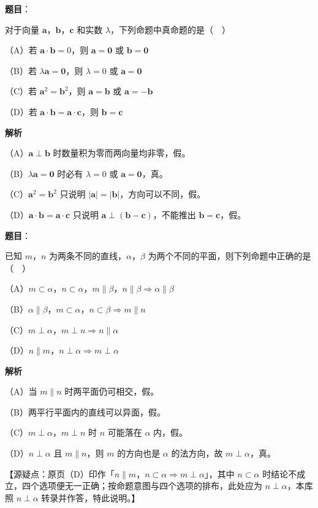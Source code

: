 \begin{answer}

\textbf{题目}：

对于向量 $\boldsymbol a$，$\boldsymbol b$，$\boldsymbol c$ 和实数 $\lambda$，下列命题中真命题的是（　）

（A）若 $\boldsymbol a\cdot\boldsymbol b=0$，则 $\boldsymbol a=\boldsymbol 0$ 或 $\boldsymbol b=\boldsymbol 0$

（B）若 $\lambda\boldsymbol a=\boldsymbol 0$，则 $\lambda=0$ 或 $\boldsymbol a=\boldsymbol 0$

（C）若 $\boldsymbol a^2=\boldsymbol b^2$，则 $\boldsymbol a=\boldsymbol b$ 或 $\boldsymbol a=-\boldsymbol b$

（D）若 $\boldsymbol a\cdot\boldsymbol b=\boldsymbol a\cdot\boldsymbol c$，则 $\boldsymbol b=\boldsymbol c$

\textbf{解析}

（A）$\boldsymbol a\perp\boldsymbol b$ 时数量积为零而两向量均非零，假。

（B）$\lambda\boldsymbol a=\boldsymbol 0$ 时必有 $\lambda=0$ 或 $\boldsymbol a=\boldsymbol 0$，真。

（C）$\boldsymbol a^2=\boldsymbol b^2$ 只说明 $|\boldsymbol a|=|\boldsymbol b|$，方向可以不同，假。

（D）$\boldsymbol a\cdot\boldsymbol b=\boldsymbol a\cdot\boldsymbol c$ 只说明 $\boldsymbol a\perp(\boldsymbol b-\boldsymbol c)$，不能推出 $\boldsymbol b=\boldsymbol c$，假。


\end{answer}
\begin{answer}

\textbf{题目}：

已知 $m$，$n$ 为两条不同的直线，$\alpha$，$\beta$ 为两个不同的平面，则下列命题中正确的是（　）

（A）$m\subset\alpha$，$n\subset\alpha$，$m\parallel\beta$，$n\parallel\beta\Rightarrow\alpha\parallel\beta$

（B）$\alpha\parallel\beta$，$m\subset\alpha$，$n\subset\beta\Rightarrow m\parallel n$

（C）$m\perp\alpha$，$m\perp n\Rightarrow n\parallel\alpha$

（D）$n\parallel m$，$n\perp\alpha\Rightarrow m\perp\alpha$

\textbf{解析}

（A）当 $m\parallel n$ 时两平面仍可相交，假。

（B）两平行平面内的直线可以异面，假。

（C）$m\perp\alpha$，$m\perp n$ 时 $n$ 可能落在 $\alpha$ 内，假。

（D）$n\perp\alpha$ 且 $m\parallel n$，则 $m$ 的方向也是 $\alpha$ 的法方向，故 $m\perp\alpha$，真。

【源疑点：原页（D）印作「$n\parallel m$，$n\subset\alpha\Rightarrow m\perp\alpha$」，其中 $n\subset\alpha$ 时结论不成立，四个选项便无一正确；按命题意图与四个选项的排布，此处应为 $n\perp\alpha$，本库照 $n\perp\alpha$ 转录并作答，特此说明。】


\end{answer}
